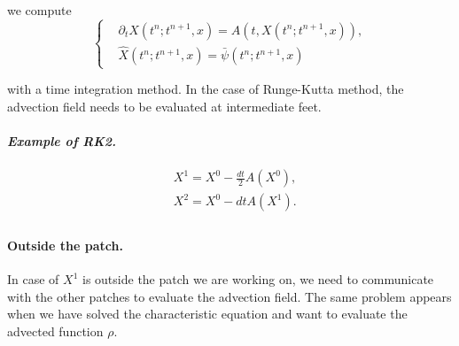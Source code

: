 \documentclass[presentation.tex]{subfiles}
\begin{document}
we compute 
\begin{equation}
\left\{
\begin{aligned}
	& \partial_t X(t^{n}; t^{n+1}, x)  = A(t, X(t^{n}; t^{n+1}, x)), \\
	& \hat{X}(t^{n}; t^{n+1}, x) = \bar{\psi} (t^{n}; t^{n+1}, x)
\end{aligned}
\right.
\end{equation}

with a time integration method. In the case of Runge-Kutta method, the advection field needs to be evaluated at intermediate feet.

\paragraph{\textit{Example of RK2.}}
\begin{equation}
\begin{aligned}
	& X^1 = X^0 - \frac{dt}{2} A(X^0), \\
	& X^2 = X^0 - dt A(X^1). \\
\end{aligned}
\end{equation}


\paragraph{Outside the patch.}
In case of $X^1$ is outside the patch we are working on, we need to communicate with the other patches to evaluate the advection field. 
The same problem appears when we have solved the characteristic equation and want to evaluate the advected function $\rho$. 
\end{document}

